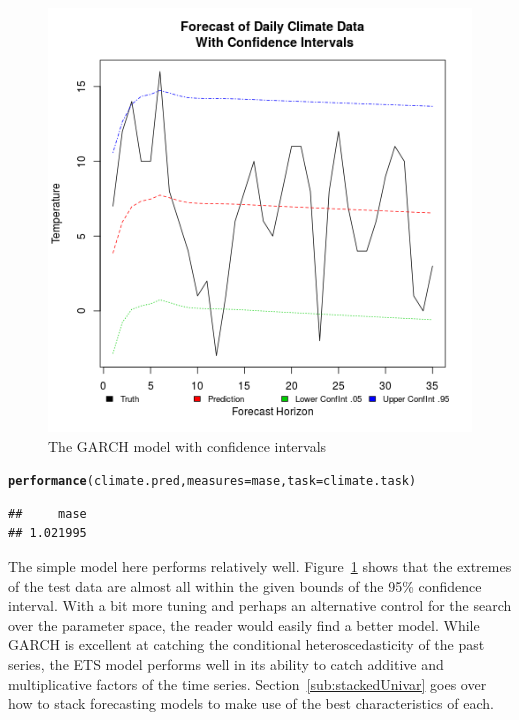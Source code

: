 \documentclass[12pt]{article}\usepackage[]{graphicx}\usepackage[]{color}
\makeatletter
\newcommand{\hlstd}[1]{\textcolor[rgb]{0.345,0.345,0.345}{#1}}%
\newcommand{\hlkwc}[1]{\textcolor[rgb]{0.333,0.667,0.333}{#1}}%
\newcommand{\hlkwd}[1]{\textcolor[rgb]{0.737,0.353,0.396}{\textbf{#1}}}%
\newenvironment{kframe}{%
 \def\at@end@of@kframe{}%
 \ifinner\ifhmode%
  \def\at@end@of@kframe{\end{minipage}}%
  \begin{minipage}{\columnwidth}%
 \fi\fi%
 \def\FrameCommand##1{\hskip\@totalleftmargin \hskip-\fboxsep
 \colorbox{shadecolor}{##1}\hskip-\fboxsep
     \hskip-\linewidth \hskip-\@totalleftmargin \hskip\columnwidth}%
 \MakeFramed {\advance\hsize-\width
   \@totalleftmargin\z@ \linewidth\hsize
   \@setminipage}}%
 {\par\unskip\endMakeFramed%
 \at@end@of@kframe}
\newenvironment{knitrout}{}{} %
\theoremstyle{definition}
\makeatother
\begin{document}
\begin{figure}[h!]
\includegraphics[width=\linewidth]{plot_garch_final.png}
\centering
\caption{The GARCH model with confidence intervals}
\label{fig:garch_final}
\end{figure}

\begin{knitrout}
\color{fgcolor}\begin{kframe}
\begin{alltt}
\hlkwd{performance}\hlstd{(climate.pred,} \hlkwc{measures} \hlstd{= mase,} \hlkwc{task} \hlstd{= climate.task)}
\end{alltt}
\begin{verbatim}
##     mase 
## 1.021995
\end{verbatim}
\end{kframe}
\end{knitrout}

\doublespacing

The simple model here performs relatively well. Figure~\ref{fig:garch_final} shows that the extremes of the test data are almost all within the given bounds of the 95\% confidence interval. With a bit more tuning and perhaps an alternative control for the search over the parameter space, the reader would easily find a better model. While GARCH is excellent at catching the conditional heteroscedasticity of the past series, the ETS model performs well in its ability to catch additive and multiplicative factors of the time series. Section~\ref{sub:stackedUnivar} goes over how to stack forecasting models to make use of the best characteristics of each.
\end{document}
